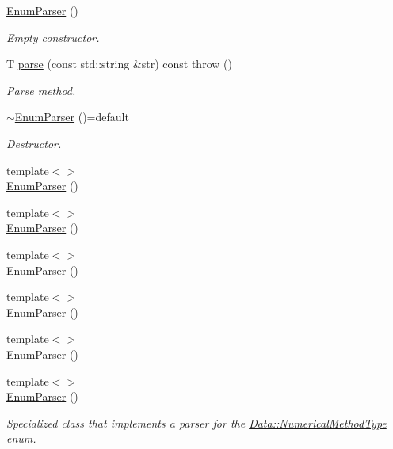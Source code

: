 \begin{DoxyCompactItemize}
\item 
\hyperlink{classFVCode3D_1_1EnumParser_a9aea725005dd5c0a0f69be19af1a4de0}{Enum\+Parser} ()
\begin{DoxyCompactList}\small\item\em Empty constructor. \end{DoxyCompactList}\item 
T \hyperlink{classFVCode3D_1_1EnumParser_a47ae536aad82ef52509472c0c7f1022e}{parse} (const std\+::string \&str) const   throw ()
\begin{DoxyCompactList}\small\item\em Parse method. \end{DoxyCompactList}\item 
\hyperlink{classFVCode3D_1_1EnumParser_ae1067c40f33ab7d9567afb8351471a4b}{$\sim$\+Enum\+Parser} ()=default
\begin{DoxyCompactList}\small\item\em Destructor. \end{DoxyCompactList}\item 
{\footnotesize template$<$$>$ }\\\hyperlink{classFVCode3D_1_1EnumParser_a8d2b6c876bec705fcc4e063760e186dd}{Enum\+Parser} ()
\item 
{\footnotesize template$<$$>$ }\\\hyperlink{classFVCode3D_1_1EnumParser_a1f83e7583927bff1f4c217386240b2a1}{Enum\+Parser} ()
\item 
{\footnotesize template$<$$>$ }\\\hyperlink{classFVCode3D_1_1EnumParser_a2fa5564d3682f4ce83ac27e621f4a4e7}{Enum\+Parser} ()
\item 
{\footnotesize template$<$$>$ }\\\hyperlink{classFVCode3D_1_1EnumParser_a15323dff273a1eeaec2fcafd71e349f4}{Enum\+Parser} ()
\item 
{\footnotesize template$<$$>$ }\\\hyperlink{classFVCode3D_1_1EnumParser_a51d7dcc3ed5b9cdae0391dd596dd2e85}{Enum\+Parser} ()
\item 
{\footnotesize template$<$$>$ }\\\hyperlink{classFVCode3D_1_1EnumParser_a8d2b6c876bec705fcc4e063760e186dd}{Enum\+Parser} ()
\begin{DoxyCompactList}\small\item\em Specialized class that implements a parser for the \hyperlink{classFVCode3D_1_1Data_a5222e1901276af4586befd821445c6cf}{Data\+::\+Numerical\+Method\+Type} enum. \end{DoxyCompactList}\item 

\end{DoxyCompactItemize}
